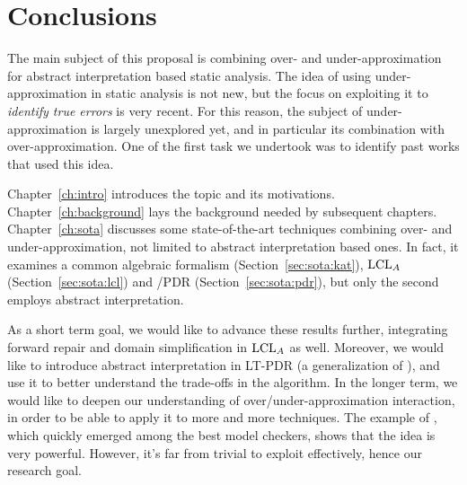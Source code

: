 
\chapter{Conclusions}\label{ch:conclusions}
The main subject of this proposal is combining over- and under-approximation for abstract interpretation based static analysis. The idea of using under-approximation in static analysis is not new, but the focus on exploiting it to \emph{identify true errors} is very recent. For this reason, the subject of under-approximation is largely unexplored yet, and in particular its combination with over-approximation. One of the first task we undertook was to identify past works that used this idea.

Chapter~\ref{ch:intro} introduces the topic and its motivations. Chapter~\ref{ch:background} lays the background needed by subsequent chapters.
Chapter~\ref{ch:sota} discusses some state-of-the-art techniques combining over- and under-approximation, not limited to abstract interpretation based ones. In fact, it examines a common algebraic formalism (Section~\ref{sec:sota:kat}), $\text{LCL}_A$ (Section~\ref{sec:sota:lcl}) and /PDR (Section~\ref{sec:sota:pdr}), but only the second employs abstract interpretation.

As a short term goal, we would like to advance these results further, integrating forward repair and domain simplification in $\text{LCL}_A$ as well. Moreover, we would like to introduce abstract interpretation in LT-PDR (a generalization of ), and use it to better understand the trade-offs in the algorithm.
In the longer term, we would like to deepen our understanding of over/under-approximation interaction, in order to be able to apply it to more and more techniques. The example of , which quickly emerged among the best model checkers, shows that the idea is very powerful. However, it's far from trivial to exploit effectively, hence our research goal.
